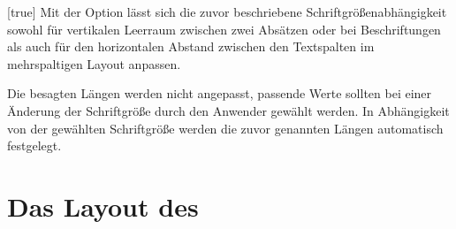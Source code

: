 \begin{Declaration*}{}
\begin{Declaration*}{}
\begin{Declaration*}{}
\begin{Declaration}[v2.05]{}[true]%
\printdeclarationlist%
%
Mit der Option  lässt sich die zuvor beschriebene 
Schriftgrößenabhängigkeit sowohl für vertikalen Leerraum zwischen zwei Absätzen 
oder bei Beschriftungen als auch für den horizontalen Abstand zwischen den 
Textspalten im mehrspaltigen Layout anpassen.
%
\begin{values}{}
  Die besagten Längen werden nicht angepasst, passende Werte sollten bei einer 
  Änderung der Schriftgröße durch den Anwender gewählt werden.
  In Abhängigkeit von der gewählten Schriftgröße werden die zuvor genannten 
  Längen automatisch festgelegt.
\end{values}
\end{Declaration}



\section{Das Layout des \CDs}
%
%


\end{Declaration*}
\end{Declaration*}
\end{Declaration*}
